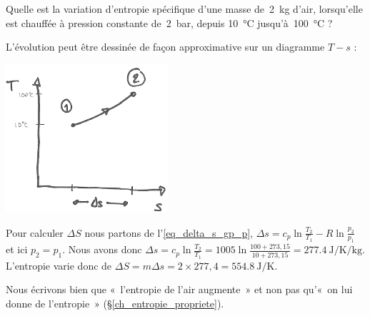 		\clearfloats
		\begin{anexample}
			Quelle est la variation d’entropie spécifique d’une masse de~\SI{2}{\kilogram} d’air, lorsqu’elle est chauffée à pression constante de~\SI{2}{\bar}, depuis \SI{10}{\degreeCelsius} jusqu’à~\SI{100}{\degreeCelsius} ?
			
				\begin{answer}
					L’évolution peut être dessinée de façon approximative sur un diagramme $T-s$ :\\
						\begin{center}\includegraphics[width=6cm]{images/ts_example_1.png}\end{center}
					Pour calculer $\Delta S$ nous partons de l’\cref{eq_delta_s_gp_p}, $\Delta s = c_p \ln \frac{T_2}{T_1} - R \ln \frac{p_2}{p_1}$ et ici $p_2=p_1$. Nous avons donc $\Delta s = c_p \ln \frac{T_2}{T_1} = \num{1005} \ln \frac{100+273,15}{10+273,15} =  \SI{+277,4}{\joule\per\kelvin\per\kilogram}$. \\L’entropie varie donc de $\Delta S = m \Delta s = 2 \times 277,4 = \SI{+554,8}{\joule\per\kelvin}$. 
				
				\begin{remark}Nous écrivons bien que «~l’entropie de l’air augmente~» et non pas qu’«~on lui donne de l’entropie~» (\S\ref{ch_entropie_propriete}).\end{remark}\end{answer}
		\end{anexample}


